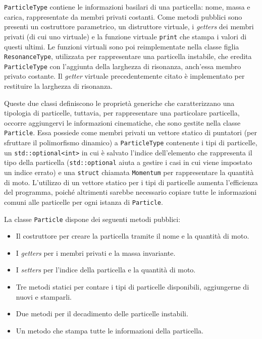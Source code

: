 \documentclass{article}
\begin{document}
\verb|ParticleType| contiene le informazioni basilari di una particella: nome, massa e carica, rappresentate da membri privati costanti. Come metodi pubblici sono presenti un costruttore parametrico, un distruttore virtuale, i \textit{getters} dei membri privati (di cui uno virtuale) e la funzione virtuale \verb|print| che stampa i valori di questi ultimi. Le funzioni virtuali sono poi reimplementate nella classe figlia \verb|ResonanceType|, utilizzata per rappresentare una particella instabile, che eredita \verb|ParticleType| con l'aggiunta della larghezza di risonanza, anch'essa membro privato costante. Il \textit{getter} virtuale precedentemente citato è implementato per restituire la larghezza di risonanza.

Queste due classi definiscono le proprietà generiche che caratterizzano una tipologia di particelle, tuttavia, per rappresentare una particolare particella, occorre aggiungervi le informazioni cinematiche, che sono gestite nella classe \verb|Particle|. Essa possiede come membri privati un vettore statico di puntatori (per sfruttare il polimorfismo dinamico) a \verb|ParticleType| contenente i tipi di particelle, un \verb|std::optional<int>| in cui è salvato l'indice dell'elemento che rappresenta il tipo della particella (\verb|std::optional| aiuta a gestire i casi in cui viene impostato un indice errato) e una \verb|struct| chiamata \verb|Momentum| per rappresentare la quantità di moto. L'utilizzo di un vettore statico per i tipi di particelle aumenta l'efficienza del programma, poiché altrimenti sarebbe necessario copiare tutte le informazioni comuni alle particelle per ogni istanza di \verb|Particle|.

La classe \verb|Particle| dispone dei seguenti metodi pubblici:
\begin{itemize}
    \item Il costruttore per creare la particella tramite il nome e la quantità di moto.
    \item I \textit{getters} per i membri privati e la massa invariante.
    \item I \textit{setters} per l'indice della particella e la quantità di moto.
    \item Tre metodi statici per contare i tipi di particelle disponibili, aggiungerne di nuovi e stamparli.
    \item Due metodi per il decadimento delle particelle instabili.
    \item Un metodo che stampa tutte le informazioni della particella.
\end{itemize}
\end{document}

